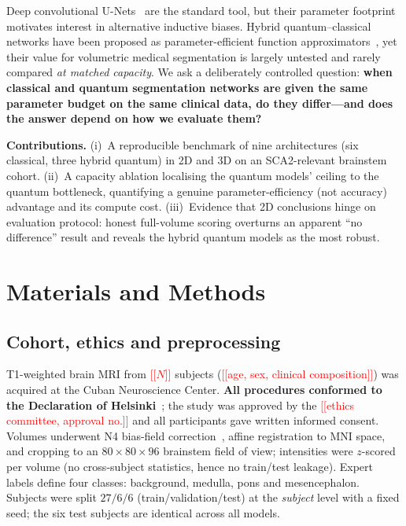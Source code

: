 \documentclass[runningheads]{llncs}
\newcommand{\todo}[1]{\textcolor{red}{[[#1]]}}
\begin{document}
Deep convolutional U-Nets~\cite{unet,unet3d} are the standard tool, but their
parameter footprint motivates interest in alternative inductive biases. Hybrid
quantum--classical networks have been proposed as parameter-efficient function
approximators~\cite{qcnn}, yet their value for volumetric medical segmentation
is largely untested and rarely compared \emph{at matched capacity}. We ask a
deliberately controlled question: \textbf{when classical and quantum
segmentation networks are given the same parameter budget on the same clinical
data, do they differ---and does the answer depend on how we evaluate them?}

\noindent\textbf{Contributions.}
(i)~A reproducible benchmark of nine architectures (six classical, three
hybrid quantum) in 2D and 3D on an SCA2-relevant brainstem cohort.
(ii)~A capacity ablation localising the quantum models' ceiling to the quantum
bottleneck, quantifying a genuine parameter-efficiency (not accuracy) advantage
and its compute cost.
(iii)~Evidence that 2D conclusions hinge on evaluation protocol: honest
full-volume scoring overturns an apparent ``no difference'' result and reveals
the hybrid quantum models as the most robust.

\section{Materials and Methods}

\subsection{Cohort, ethics and preprocessing}
T1-weighted brain MRI from \todo{$N$} subjects (\todo{age, sex, clinical
composition}) was acquired at the Cuban Neuroscience Center.
\textbf{All procedures conformed to the Declaration of
Helsinki}~\cite{helsinki}; the study was approved by the
\todo{ethics committee, approval no.} and all participants gave written
informed consent. Volumes underwent N4 bias-field correction~\cite{n4},
affine registration to MNI space, and cropping to an $80\times80\times96$
brainstem field of view; intensities were $z$-scored per volume (no
cross-subject statistics, hence no train/test leakage). Expert labels define
four classes: background, medulla, pons and mesencephalon. Subjects were split
$27/6/6$ (train/validation/test) at the \emph{subject} level with a fixed seed;
the six test subjects are identical across all models.
\end{document}
